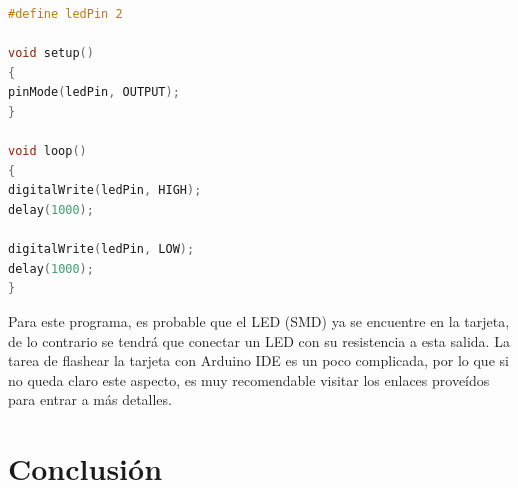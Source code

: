 \documentclass[conference]{IEEEtran}
\begin{document}
\begin{lstlisting}[language=C, caption={Programa que hace parpadear el LED en el pin 2}]
#define ledPin 2

void setup()
{
pinMode(ledPin, OUTPUT);
}

void loop()
{
digitalWrite(ledPin, HIGH);
delay(1000);

digitalWrite(ledPin, LOW);
delay(1000);
}
\end{lstlisting}

Para este programa, es probable que el LED (SMD) ya se encuentre en la tarjeta, de lo contrario se tendrá que conectar un LED con su resistencia a esta salida. La tarea de flashear la tarjeta con Arduino IDE es un poco complicada, por lo que si no queda claro este aspecto, es muy recomendable visitar los enlaces proveídos para entrar a más detalles.



\section{Conclusión}\label{sec:conclusion}




\printbibliography
\end{document}
